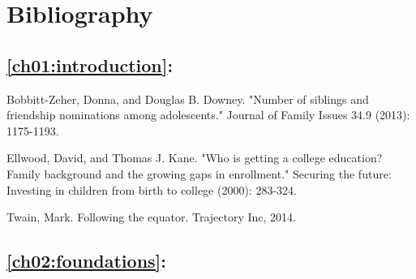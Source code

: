 \cleardoublepage
\section*{Bibliography}

\subsection*{\ref{ch01:introduction}:  }

\begin{description}

	\item Bobbitt-Zeher, Donna, and Douglas B. Downey. "Number of siblings and friendship nominations among adolescents." Journal of Family Issues 34.9 (2013): 1175-1193.
	
	\item Ellwood, David, and Thomas J. Kane. "Who is getting a college education? Family background and the growing gaps in enrollment." Securing the future: Investing in children from birth to college (2000): 283-324.

	\item Twain, Mark. Following the equator. Trajectory Inc, 2014.
	
\end{description}

\subsection*{\ref{ch02:foundations}: }

